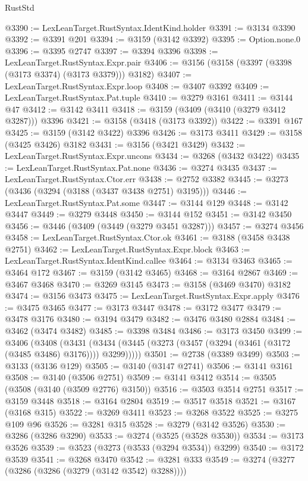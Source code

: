 \begin{lexlean}{RustStd}
\begin{coremodule}
@3390 := LexLeanTarget.RustSyntax.IdentKind.holder
@3391 := @3134 @3390
@3392 := @3391 @201
@3394 := @3159 (@3142 @3392)
@3395 := Option.none.{0}
@3396 := @3395 @2747
@3397 := @3394 @3396
@3398 := LexLeanTarget.RustSyntax.Expr.pair
@3406 := @3156 (@3158 (@3397 (@3398 (@3173 @3374) (@3173 @3379))) @3182)
@3407 := LexLeanTarget.RustSyntax.Expr.loop
@3408 := @3407 @3392
@3409 := LexLeanTarget.RustSyntax.Pat.tuple
@3410 := @3279 @3161
@3411 := @3144 @47
@3412 := @3142 @3411
@3418 := @3159 (@3409 (@3410 (@3279 @3412 @3287))) @3396
@3421 := @3158 (@3418 (@3173 @3392))
@3422 := @3391 @167
@3425 := @3159 (@3142 @3422) @3396
@3426 := @3173 @3411
@3429 := @3158 (@3425 @3426) @3182
@3431 := @3156 (@3421 @3429)
@3432 := LexLeanTarget.RustSyntax.Expr.uncons
@3434 := @3268 (@3432 @3422)
@3435 := LexLeanTarget.RustSyntax.Pat.none
@3436 := @3274 @3435
@3437 := LexLeanTarget.RustSyntax.Ctor.err
@3438 := @2752 @3382
@3445 := @3273 (@3436 (@3294 (@3188 (@3437 @3438 @2751) @3195)))
@3446 := LexLeanTarget.RustSyntax.Pat.some
@3447 := @3144 @129
@3448 := @3142 @3447
@3449 := @3279 @3448
@3450 := @3144 @152
@3451 := @3142 @3450
@3456 := @3446 (@3409 (@3449 (@3279 @3451 @3287)))
@3457 := @3274 @3456
@3458 := LexLeanTarget.RustSyntax.Ctor.ok
@3461 := @3188 (@3458 @3438 @2751)
@3462 := LexLeanTarget.RustSyntax.Expr.block
@3463 := LexLeanTarget.RustSyntax.IdentKind.callee
@3464 := @3134 @3463
@3465 := @3464 @172
@3467 := @3159 (@3142 @3465)
@3468 := @3164 @2867
@3469 := @3467 @3468
@3470 := @3269 @3145
@3473 := @3158 (@3469 @3470) @3182
@3474 := @3156 @3473
@3475 := LexLeanTarget.RustSyntax.Expr.apply
@3476 := @3475 @3465
@3477 := @3173 @3447
@3478 := @3172 @3477
@3479 := @3478 @3176
@3480 := @3194 @3479
@3482 := @3476 @3480 @2884
@3484 := @3462 (@3474 @3482)
@3485 := @3398 @3484
@3486 := @3173 @3450
@3499 := @3406
    (@3408
      (@3431 (@3434 (@3445 (@3273 (@3457 (@3294 (@3461 (@3172 (@3485 @3486) @3176)))) @3299)))))
@3501 := @2738 (@3389 @3499)
@3503 := @3133 (@3136 @129)
@3505 := @3140 (@3147 @2741)
@3506 := @3141 @3161
@3508 := @3140 (@3506 @2751)
@3509 := @3141 @3412
@3514 := @3505 (@3508 (@3140 (@3509 @2776) @3150))
@3516 := @3503 @3514 @2751
@3517 := @3159 @3448
@3518 := @3164 @2804
@3519 := @3517 @3518
@3521 := @3167 (@3168 @315)
@3522 := @3269 @3411
@3523 := @3268 @3522
@3525 := @3275 @109 @96
@3526 := @3281 @315
@3528 := @3279 (@3142 @3526)
@3530 := @3286 (@3286 @3290)
@3533 := @3274 (@3525 (@3528 @3530))
@3534 := @3173 @3526
@3539 := @3523 (@3273 (@3533 (@3294 @3534)) @3299)
@3540 := @3172 @3539
@3541 := @3268 @3470
@3542 := @3281 @333
@3549 := @3274 (@3277 (@3286 (@3286 (@3279 (@3142 @3542) @3288))))

\end{coremodule}
\end{lexlean}
